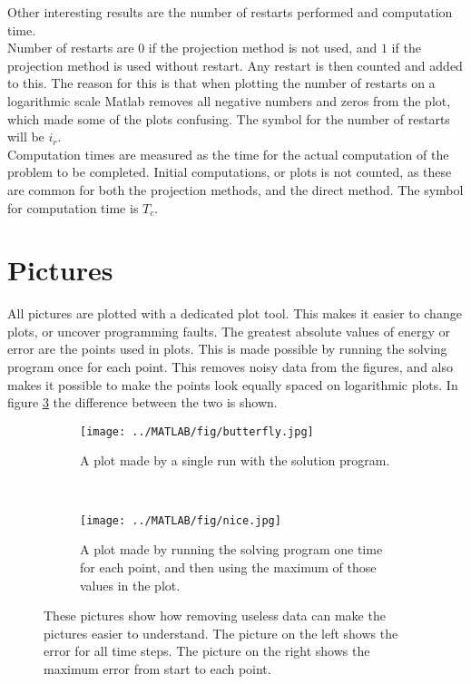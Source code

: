 Other interesting results are the number of restarts performed and computation time. \\
Number of restarts are $0$ if the projection method is not used, and $1$ if the projection method is used without restart. Any restart is then counted and added to this. The reason for this is that when plotting the number of restarts on a logarithmic scale Matlab removes all negative numbers and zeros from the plot, which made some of the plots confusing. The symbol for the number of restarts will be $i_r$.\\
Computation times are measured as the time for the actual computation of the problem to be completed. Initial computations, or plots is not counted, as these are common for both the projection methods, and the direct method. %
The symbol for computation time is $T_c$.  \\

\section{Pictures}%
All pictures are plotted with a dedicated plot tool. This makes it easier to change plots, or uncover programming faults. The greatest absolute values of energy or error are the points used in plots. This is made possible by running the solving program once for each point. This removes noisy data from the figures, and also makes it possible to make the points look equally spaced on logarithmic plots. In figure \ref{fig:pic} the difference between the two is shown. \\
\begin{figure}[H]
        \centering
        \begin{subfigure}[b]{0.45\textwidth}
                \texttt{[image: ../MATLAB/fig/butterfly.jpg]}
                \caption{ A plot made by a single run with the solution program. }
                \label{fig:butterfly}
        \end{subfigure}
        ~
        \begin{subfigure}[b]{0.45\textwidth}
                \texttt{[image: ../MATLAB/fig/nice.jpg]}
                \caption{ A plot made by running the solving program one time for each point, and then using the maximum of those values in the plot. }
                \label{fig:nice}
        \end{subfigure}
        \caption{ These pictures show how removing useless data can make the pictures easier to understand. The picture on the left shows the error for all time steps. The picture on the right shows the maximum error from start to each point. }
        \label{fig:pic}
\end{figure}


